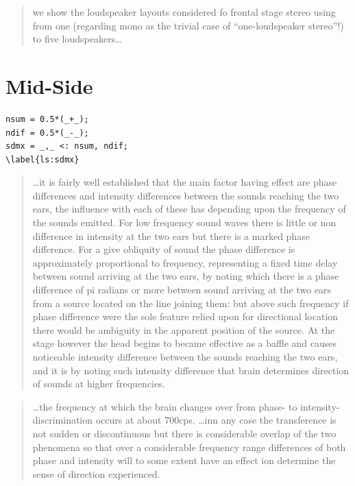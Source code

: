 \documentclass{article}
\begin{document}
\begin{quotation}
we show the loudspeaker layouts considered fo frontal stage stereo using from one (regarding mono as the trivial case of “one-loudspeaker stereo”!) to five loudspeakers… \cite{mg92pdmsss}
\end{quotation}

\vfill\null

\newpage

\section{Mid-Side}
\label{sec:midside}

\begin{lstlisting}
nsum = 0.5*(_+_);
ndif = 0.5*(_-_);
sdmx = _,_ <: nsum, ndif;
\label{ls:sdmx}
\end{lstlisting}

\begin{quotation}
…it is fairly well established that the main factor having effect are phase
differences and intensity differences between the sounds reaching the two ears,
the influence with each of these has depending upon the frequency of the sounds
emitted. For low frequency sound waves there is little or non difference in
intensity at the two ears but there is a marked phase difference. For a give
obliquity of sound the phase difference is approximately proportional to
frequency, representing a fixed time delay between sound arriving at the two
ears, by noting which there is a phase difference of pi radians or more between
sound arriving at the two ears from a source located on the line joining them:
but above such frequency if phase difference were the sole feature relied upon
for directional location there would be ambiguity in the apparent position of
the source. At the stage however the head begins to became effective as a baffle
and causes noticeable intensity difference between the sounds reaching the two
ears, and it is by noting such intensity difference that brain determines
direction of sounds at higher frequencies.
\end{quotation}

\begin{quotation}
…the frequency at which the brain changes over from phase- to
intensity-discrimination occurs at about 700cps. …inn any case the transference
is not sudden or discontinuous but there is considerable overlap of the two
phenomena so that over a considerable frequency range differences of both phase
and intensity will to some extent have an effect ion determine the sense of
direction experienced.
\end{quotation}
\end{document}
